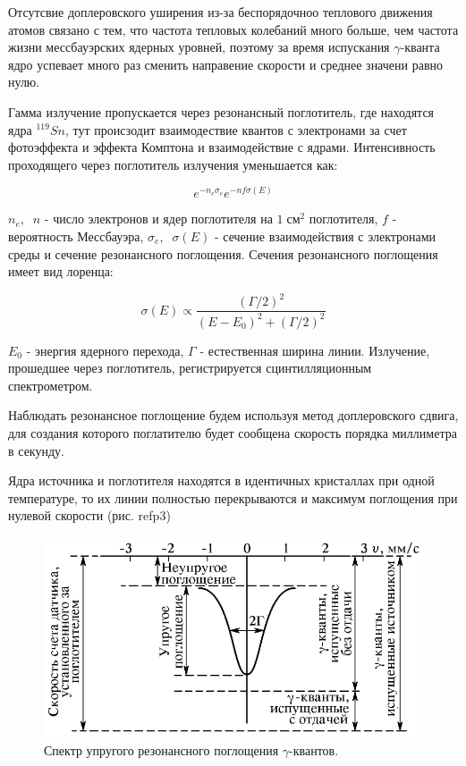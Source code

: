 \documentclass[a4paper]{article}
\begin{document}
Отсутсвие доплеровского уширения из-за беспорядочноо теплового движения атомов связано с тем, что частота тепловых колебаний много больше, чем 
частота жизни мессбауэрских ядерных уровней, поэтому за время испускания $\gamma$-кванта ядро успевает много раз сменить направение скорости и 
среднее значени равно нулю. \par 

Гамма излучение пропускается через резонансный поглотитель, где находятся ядра $^{119}Sn$, тут происзодит взаимодествие квантов с электронами за счет фотоэффекта и эффекта Комптона и взаимодействие с ядрами. 
Интенсивность проходящего через поглотитель излучения уменьшается как:

\begin{equation}
    e^{-n_e \sigma_e} e^{-n f \sigma(E)}
\end{equation}

$n_e, \;\; n$ - число электронов и ядер поглотителя на $1 \; см^2$ поглотителя, $f$ - вероятность Мессбауэра, $\sigma_e, \;\; \sigma(E)$ - 
сечение взаимодействия с электронами среды и сечение резонансного поглощения. Сечения резонансного поглощения имеет вид лоренца:

\begin{equation}
    \sigma(E) \propto \frac{(\Gamma/2)^2}{(E - E_0)^2 + (\Gamma/2)^2}
\end{equation}


$E_0$ - энергия ядерного перехода, $\Gamma$ - естественная ширина линии. Излучение, прошедшее через поглотитель, регистрируется сцинтилляционным спектрометром. \par 

Наблюдать резонансное поглощение будем используя метод доплеровского сдвига, для создания которого поглатителю будет сообщена скорость порядка миллиметра в секунду. 

Ядра источника и поглотителя находятся в идентичных кристаллах при одной температуре, то их линии полностью перекрываются и максимум поглощения при нулевой скорости (рис. ref{p3})

\begin{figure}
    \begin{center}
        \includegraphics[scale = 0.5]{p3.png}
        \caption{Спектр упругого резонансного поглощения $\gamma$-квантов.}
        \label{p3}
    \end{center}
\end{figure}
\end{document}
